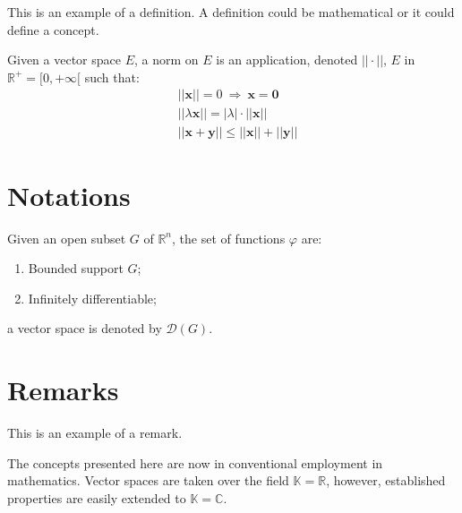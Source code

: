 \documentclass[11pt,fleqn,a5paper]{book} %
\begin{document}
    This is an example of a definition. A definition could be mathematical or it could define a concept.
    
    \begin{definition}
    Given a vector space $E$, a norm on $E$ is an application, denoted $||\cdot||$, $E$ in $\mathbb{R}^+=[0,+\infty[$ such that:
    \begin{align}
    & ||\mathbf{x}||=0\ \Rightarrow\ \mathbf{x}=\mathbf{0}\\
    & ||\lambda \mathbf{x}||=|\lambda|\cdot ||\mathbf{x}||\\
    & ||\mathbf{x}+\mathbf{y}||\leq ||\mathbf{x}||+||\mathbf{y}||
    \end{align}
    \end{definition}
    
    
    \section{Notations}
    
    \begin{notation}
    Given an open subset $G$ of $\mathbb{R}^n$, the set of functions $\varphi$ are:
    \begin{enumerate}
    \item Bounded support $G$;
    \item Infinitely differentiable;
    \end{enumerate}
    a vector space is denoted by $\mathcal{D}(G)$. 
    \end{notation}
    
    
    \section{Remarks}
    
    This is an example of a remark.
    
    \begin{remark}
    The concepts presented here are now in conventional employment in mathematics. Vector spaces are taken over the field $\mathbb{K}=\mathbb{R}$, however, established properties are easily extended to $\mathbb{K}=\mathbb{C}$.
    \end{remark}
    
    
\end{document}
